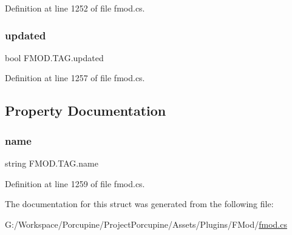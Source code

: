 Definition at line 1252 of file fmod.\+cs.

\mbox{\label{struct_f_m_o_d_1_1_t_a_g_a100d6ea833e20d543c9176a19f435a98}} 
\subsubsection{\texorpdfstring{updated}{updated}}
{\footnotesize\ttfamily bool F\+M\+O\+D.\+T\+A\+G.\+updated}



Definition at line 1257 of file fmod.\+cs.



\subsection{Property Documentation}
\mbox{\label{struct_f_m_o_d_1_1_t_a_g_af1470d1d5ea0daa425328d623c55cca9}} 
\subsubsection{\texorpdfstring{name}{name}}
{\footnotesize\ttfamily string F\+M\+O\+D.\+T\+A\+G.\+name\hspace{0.3cm}{\ttfamily [get]}}



Definition at line 1259 of file fmod.\+cs.



The documentation for this struct was generated from the following file\+:\begin{DoxyCompactItemize}
\item 
G\+:/\+Workspace/\+Porcupine/\+Project\+Porcupine/\+Assets/\+Plugins/\+F\+Mod/\hyperlink{fmod_8cs}{fmod.\+cs}\end{DoxyCompactItemize}

